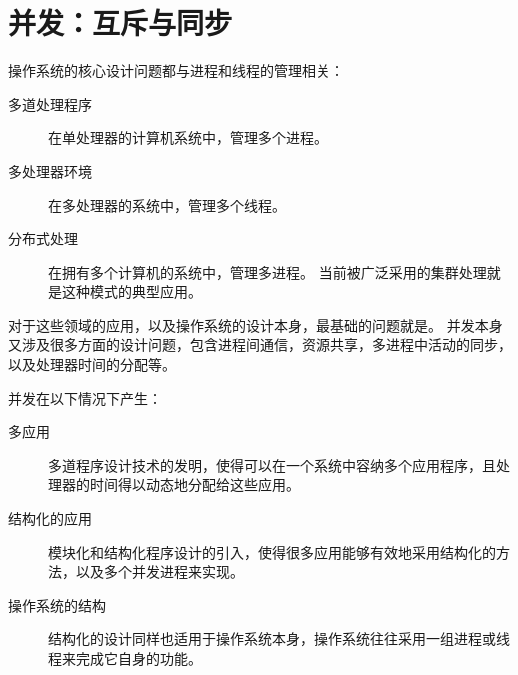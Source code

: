 
\chapter{并发：互斥与同步}
{
    操作系统的核心设计问题都与进程和线程的管理相关：

    \begin{description}
        \item[多道处理程序] 在单处理器的计算机系统中，管理多个进程。
        \item[多处理器环境] 在多处理器的系统中，管理多个线程。
        \item[分布式处理]
        {
            在拥有多个计算机的系统中，管理多进程。
            当前被广泛采用的集群处理就是这种模式的典型应用。
        }
    \end{description}

    对于这些领域的应用，以及操作系统的设计本身，最基础的问题就是。
    并发本身又涉及很多方面的设计问题，包含进程间通信，资源共享，多进程中活动的同步，以及处理器时间的分配等。

    并发在以下情况下产生：

    \begin{description}
        \item[多应用] 多道程序设计技术的发明，使得可以在一个系统中容纳多个应用程序，且处理器的时间得以动态地分配给这些应用。
        \item[结构化的应用] 模块化和结构化程序设计的引入，使得很多应用能够有效地采用结构化的方法，以及多个并发进程来实现。
        \item[操作系统的结构] 结构化的设计同样也适用于操作系统本身，操作系统往往采用一组进程或线程来完成它自身的功能。
    \end{description}

    
    
    
    
    
    
    
}

\cleardoublepage

\endinput
